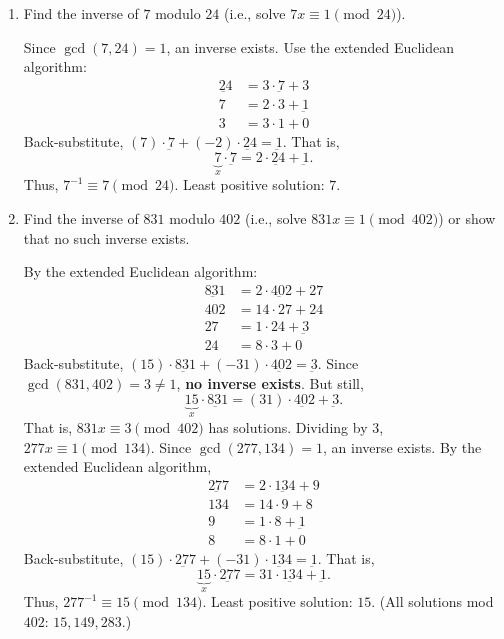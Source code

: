 \documentclass[11pt]{article}
\begin{document}
\begin{enumerate}
  \item Find the inverse of $7$ modulo $24$ (i.e., solve $7x\equiv1\pmod{24}$).
  \begin{subanswer}
    Since $\gcd(7,24)=1$, an inverse exists. Use the extended Euclidean algorithm:
    \begin{align*}
      \underbar{24} &= 3 \cdot \underbar{7} + 3 \\
      7 &= 2 \cdot 3 + \underbar{1} \\
      3 &= 3 \cdot 1 + 0
    \end{align*}
    Back-substitute, $(7) \cdot \underbar{7} + (-2) \cdot \underbar{24}=\underbar{1}.$
    That is, $$\underbrace{7}_{x} \cdot \underbar{7} = 2 \cdot \underbar{24} + \underbar{1}.$$
    Thus, $7^{-1} \equiv 7 \pmod{24}$. Least positive solution: $\boxed{7}$.
  \end{subanswer}

  \item Find the inverse of $831$ modulo $402$ (i.e., solve $831x\equiv1\pmod{402}$) or show that no such inverse exists.
  \begin{subanswer}
    By the extended Euclidean algorithm:
    \begin{align*}
      \underbar{831} &= 2 \cdot \underbar{402} + 27 \\
      402 &= 14 \cdot 27 + 24 \\
      27 &= 1 \cdot 24 + \underbar{3} \\
      24 &= 8 \cdot 3 + 0
    \end{align*}
    Back-substitute, $(15) \cdot \underbar{831} + (- 31) \cdot \underbar{402}=\underbar{3}.$ Since $\gcd(831,402)=3\neq1$, \textbf{no inverse exists}.
    But still, $$\underbrace{15}_{x} \cdot \underbar{831} = (31) \cdot \underbar{402} + \underbar{3}.$$
    That is, $831x\equiv3\pmod{402}$ has solutions. 
    Dividing by $3$, $277x\equiv1\pmod{134}$. Since $\gcd(277,134)=1$, an inverse exists. By the extended Euclidean algorithm,
    \begin{align*}
      \underbar{277} &= 2 \cdot \underbar{134} + 9 \\
      134 &= 14 \cdot 9 + 8 \\
      9 &= 1 \cdot 8 + \underbar{1} \\
      8 &= 8 \cdot 1 + 0
    \end{align*}
    Back-substitute, $(15) \cdot \underbar{277} + (- 31) \cdot \underbar{134}=\underbar{1}.$
    That is, $$\underbrace{15}_{x} \cdot \underbar{277} = 31 \cdot \underbar{134} + \underbar{1}.$$
    Thus, $277^{-1} \equiv 15 \pmod{134}$. Least positive solution: $\boxed{15}$. (All solutions mod $402$: $15,149,283$.)
    
  \end{subanswer}
\end{enumerate}
\end{document}
